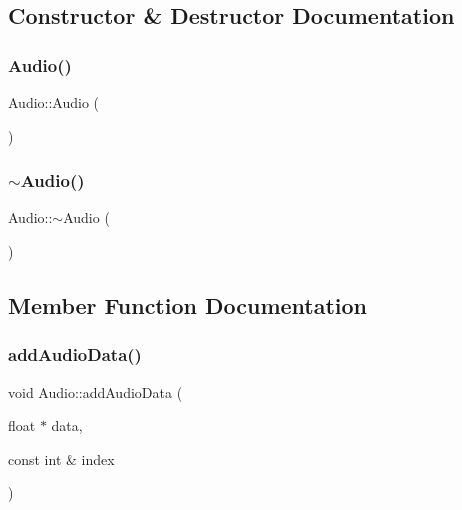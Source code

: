 \subsection{Constructor \& Destructor Documentation}
\mbox{\label{classAudio_aa9d3935a2b91ab4b825bc0cb05f245ea}} 
\subsubsection{\texorpdfstring{Audio()}{Audio()}}
{\footnotesize\ttfamily Audio\+::\+Audio (\begin{DoxyParamCaption}{ }\end{DoxyParamCaption})}

\mbox{\label{classAudio_ae8f54deecb5f48511aaab469e80294d6}} 
\subsubsection{\texorpdfstring{$\sim$\+Audio()}{~Audio()}}
{\footnotesize\ttfamily Audio\+::$\sim$\+Audio (\begin{DoxyParamCaption}{ }\end{DoxyParamCaption})}



\subsection{Member Function Documentation}
\mbox{\label{classAudio_aa32f7a0d28f33b6c7b40849b7bed17ec}} 
\subsubsection{\texorpdfstring{add\+Audio\+Data()}{addAudioData()}}
{\footnotesize\ttfamily void Audio\+::add\+Audio\+Data (\begin{DoxyParamCaption}\item[{float $\ast$}]{data,  }\item[{const int \&}]{index }\end{DoxyParamCaption})}

\mbox{\label{classAudio_a58f3992de74732128644d966102cd211}} 
